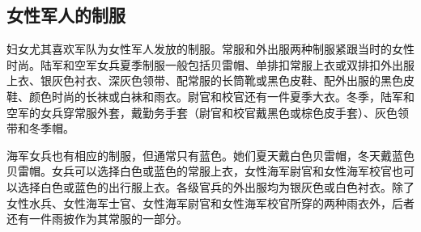 \subsection{女性军人的制服}

妇女尤其喜欢军队为女性军人发放的制服。常服和外出服两种制服紧跟当时的女性时尚。陆军和空军女兵夏季制服一般包括贝雷帽、单排扣常服上衣或双排扣外出服上衣、银灰色衬衣、深灰色领带、配常服的长筒靴或黑色皮鞋、配外出服的黑色皮鞋、颜色时尚的长袜或白袜和雨衣。尉官和校官还有一件夏季大衣。冬季，陆军和空军的女兵穿常服外套，戴勤务手套（尉官和校官戴黑色或棕色皮手套）、灰色领带和冬季帽。

海军女兵也有相应的制服，但通常只有蓝色。她们夏天戴白色贝雷帽，冬天戴蓝色贝雷帽。女兵可以选择白色或蓝色的常服上衣，女性海军尉官和女性海军校官也可以选择白色或蓝色的出行服上衣。各级官兵的外出服均为银灰色或白色衬衣。除了女性水兵、女性海军士官、女性海军尉官和女性海军校官所穿的两种雨衣外，后者还有一件雨披作为其常服的一部分。
